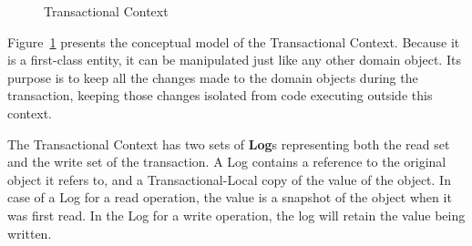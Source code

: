 \documentclass{llncs}
\begin{document}
\begin{figure}
  \centering

  \caption{Transactional Context}
  \label{fig:transactionalContext}

\end{figure}

Figure~\ref{fig:transactionalContext} presents the conceptual model of
the Transactional Context. Because it is a first-class entity, it can
be manipulated just like any other domain object. Its purpose is to
keep all the changes made to the domain objects during the
transaction, keeping those changes isolated from code executing
outside this context.

The Transactional Context has two sets of {\bf Log}s representing both
the read set and the write set of the transaction. A Log contains a
reference to the original object it refers to, and a
Transactional-Local copy of the value of the object. In case of a Log
for a read operation, the value is a snapshot of the object when it
was first read. In the Log for a write operation, the log will retain
the value being written.
\end{document}
